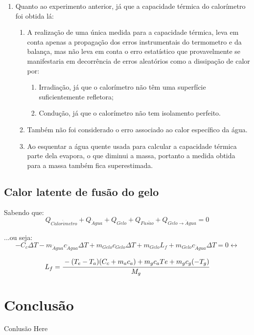 \documentclass[a4paper]{article}
\begin{document}
\begin{enumerate}
\begin{enumerate}
						\item
					\end{enumerate}
					\item Quanto ao experimento anterior, já que a capacidade térmica do calorímetro foi obtida lá:
					\begin{enumerate}
						\item A realização de uma única medida para a capacidade térmica, leva em conta apenas a propagação dos erros instrumentais do termometro e da balança, mas não leva em conta o erro estatístico que provavelmente se manifestaria em decorrência de erros aleatórios como a dissipação de calor por:
						\begin{enumerate}
							\item Irradiação, já que o calorímetro não têm uma superfície suficientemente refletora;
							\item Condução, já que o calorímetro não tem isolamento perfeito.
						\end{enumerate}
						\item Também não foi considerado o erro associado ao calor específico da água.
						\item Ao esquentar a água quente usada para calcular a capacidade térmica parte dela evapora, o que diminui a massa, portanto a medida obtida para a massa também fica superestimada.

					\end{enumerate}
				\end{enumerate}

		\subsection{Calor latente de fusão do gelo}
			Sabendo que:
			\begin{equation}
				Q_{Calor\acute{i}metro} + Q_{\acute{A}gua} + Q_{Gelo} + Q_{Fus\tilde{a}o} + Q_{Gelo \rightarrow \acute{A}gua} = 0
			\end{equation}
			
			...ou seja:
			\hspace{-2cm}%
			$$ - C_{c}\Delta T - m_{\acute{A}gua}c_{\acute{A}gua}\Delta T + m_{Gelo}c_{Gelo}\Delta T +  m_{Gelo}L_{f} + m_{Gelo}c_{\acute{A}gua}\Delta T = 0 \leftrightarrow$$
			
			  $$L_{f} = \cfrac{-(T_{e}-T_{a})(C_{c}+m_{a}c_{a}) + m_{g}c_{a}T{e} + m_{g}c_{g}(-T_{g})}{M_g}$$
			
	\section{Conclusão}

		Conlusão Here 
\end{document}
